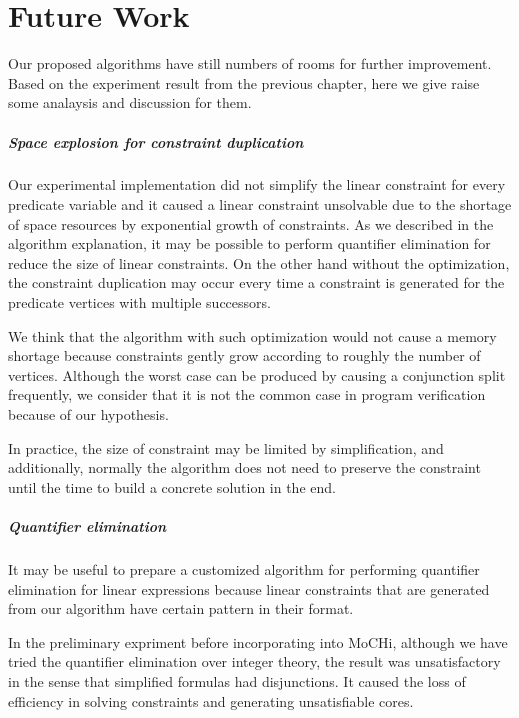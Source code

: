 ﻿\chapter{Future Work}
\label{chap:future}

Our proposed algorithms have still numbers of rooms for further
improvement.  Based on the experiment result from the previous
chapter, here we give raise some analaysis and discussion for them.


\paragraph{Space explosion for constraint duplication}
Our experimental implementation did not simplify the linear constraint
for every predicate variable and it caused a linear constraint
unsolvable due to the shortage of space resources by exponential
growth of constraints.  As we described in the algorithm explanation,
it may be possible to perform quantifier elimination for reduce the
size of linear constraints.  On the other hand without the
optimization, the constraint duplication may occur every time a
constraint is generated for the predicate vertices with multiple
successors.

We think that the algorithm with such optimization would not cause a
memory shortage because constraints gently grow according to roughly
the number of vertices.  Although the worst case can be produced by
causing a conjunction split frequently, we consider that it is not the
common case in program verification because of our hypothesis.

In practice, the size of constraint may be limited by simplification,
and additionally, normally the algorithm does not need to preserve the
constraint until the time to build a concrete solution in the end.


\paragraph{Quantifier elimination}
It may be useful to prepare a customized algorithm for performing
quantifier elimination for linear expressions because linear
constraints that are generated from our algorithm have certain pattern
in their format.

In the preliminary expriment before incorporating into MoCHi, although
we have tried the quantifier elimination over integer theory, the
result was unsatisfactory in the sense that simplified formulas had
disjunctions.  It caused the loss of efficiency in solving constraints
and generating unsatisfiable cores.

